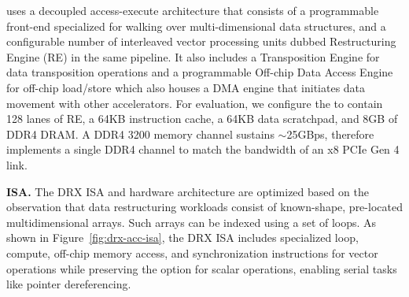 \drx uses a decoupled access-execute architecture that consists of a programmable front-end specialized for walking over multi-dimensional data structures, and a configurable number of interleaved vector processing units dubbed Restructuring Engine (RE) in the same pipeline. 
%
It also includes a Transposition Engine for data transposition operations and a programmable Off-chip Data Access Engine for off-chip load/store which also houses a DMA engine that initiates data movement with other accelerators.  %
%
For evaluation, we configure the \drx to contain 128 lanes of RE, a 64KB instruction cache, a 64KB data scratchpad, and 8GB of DDR4 DRAM.  %
A DDR4 3200 memory channel sustains $\sim$25GBps, therefore \drx implements a single DDR4 channel to match the bandwidth of an x8 PCIe Gen 4 link.%
%

\noindent \textbf{\drx ISA. }
The DRX ISA and hardware architecture are optimized based on the observation that data restructuring workloads consist of known-shape, pre-located multidimensional arrays. Such arrays can be indexed using a set of loops. As shown in Figure~\ref{fig:drx-acc-isa}, the DRX ISA includes specialized loop, compute, off-chip memory access, and synchronization instructions for vector operations while preserving the option for scalar operations, enabling serial tasks like pointer dereferencing.

